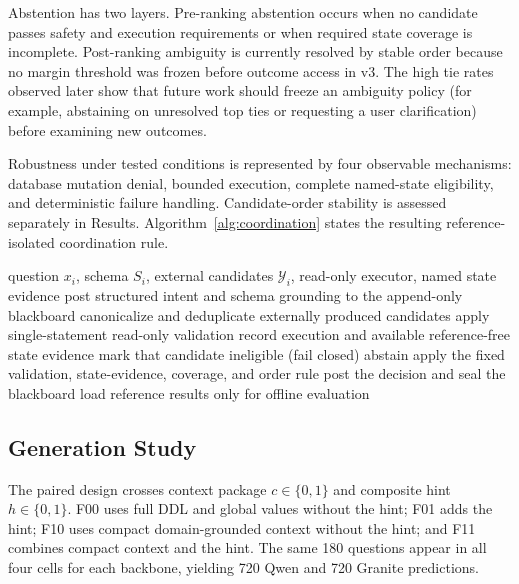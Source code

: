 \documentclass[applsci,article,submit,moreauthors]{Definitions/mdpi}
\begin{document}
Abstention has two layers. Pre-ranking abstention occurs when no candidate passes safety and execution requirements or when required state coverage is incomplete. Post-ranking ambiguity is currently resolved by stable order because no margin threshold was frozen before outcome access in v3. The high tie rates observed later show that future work should freeze an ambiguity policy (for example, abstaining on unresolved top ties or requesting a user clarification) before examining new outcomes.

Robustness under tested conditions is represented by four observable mechanisms: database mutation denial, bounded execution, complete named-state eligibility, and deterministic failure handling. Candidate-order stability is assessed separately in Results. Algorithm~\ref{alg:coordination} states the resulting reference-isolated coordination rule.

\begin{algorithm}[htbp]
\caption{Reference-isolated deterministic coordination}
\label{alg:coordination}
\begin{algorithmic}[1]
\REQUIRE question $x_i$, schema $S_i$, external candidates $\mathcal{Y}_i$, read-only executor, named state evidence
\STATE post structured intent and schema grounding to the append-only blackboard
\STATE canonicalize and deduplicate externally produced candidates
  \STATE apply single-statement read-only validation
  \STATE record execution and available reference-free state evidence
\ENDFOR
{}
  \STATE mark that candidate ineligible (fail closed)
\ENDIF
{}
  \STATE abstain
\ELSE
  \STATE apply the fixed validation, state-evidence, coverage, and order rule
\ENDIF
\STATE post the decision and seal the blackboard
\STATE load reference results only for offline evaluation
\end{algorithmic}
\end{algorithm}

\subsection{Generation Study}

The paired design crosses context package $c\in\{0,1\}$ and composite hint $h\in\{0,1\}$. F00 uses full DDL and global values without the hint; F01 adds the hint; F10 uses compact domain-grounded context without the hint; and F11 combines compact context and the hint. The same 180 questions appear in all four cells for each backbone, yielding 720 Qwen and 720 Granite predictions.
\end{document}
